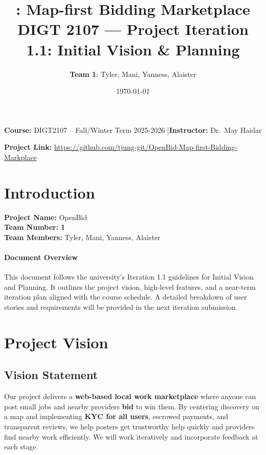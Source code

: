 \documentclass[11pt]{article}
\title{\product: Map-first Bidding Marketplace\\\Large DIGT 2107 --- Project Iteration 1.1: Initial Vision \& Planning}
\author{\textbf{Team 1}: Tyler, Mani, Yanness, Alaister}
\date{\today}
\newcommand{\product}{OpenBid}
\newcommand{\repoURL}{https://github.com/tjung-git/OpenBid-Map-first-Bidding-Markplace}
\begin{document}
\maketitle

\begin{center}
\textbf{Course:} DIGT2107 -- Fall/Winter Term 2025-2026 \quad|\quad \textbf{Instructor:} Dr.\ May Haidar
\end{center}

\begin{center}
\textbf{Project Link:} \href{\repoURL}{\repoURL}
\end{center}

\newpage

\section{Introduction}
\textbf{Project Name:} \product \\
\textbf{Team Number:} \textbf{1} \\
\textbf{Team Members:} Tyler, Mani, Yanness, Alaister

\paragraph{Document Overview}
This document follows the university's Iteration 1.1 guidelines for Initial Vision and Planning. It outlines the project vision, high-level features, and a near-term iteration plan aligned with the course schedule. A detailed breakdown of user stories and requirements will be provided in the next iteration submission.

\section{Project Vision}
\subsection*{Vision Statement}
Our project delivers a \textbf{web-based local work marketplace} where anyone can post small jobs and nearby providers \textbf{bid} to win them. By centering discovery on a map and implementing \textbf{KYC for all users}, escrowed payments, and transparent reviews, we help posters get trustworthy help quickly and providers find nearby work efficiently. We will work iteratively and incorporate feedback at each stage.
\end{document}

